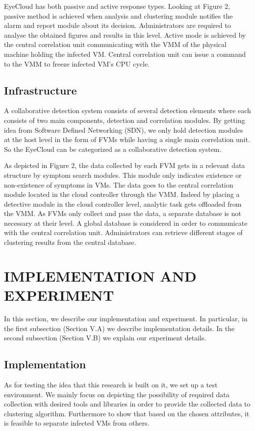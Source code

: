 \documentclass[conference]{IEEEtran}
\begin{document}
EyeCloud has both passive and active response types. Looking at Figure 2, passive method is achieved when analysis and clustering module notifies the alarm and report module about its decision. Administrators are required to analyse the obtained figures and results in this level. Active mode is achieved by the central correlation unit communicating with the VMM of the physical machine holding the infected VM. Central correlation unit can issue a command to the VMM to freeze infected VM's CPU cycle.
\subsection{Infrastructure}
A collaborative detection system consists of several detection elements where each consists of two main components, detection and correlation modules. By getting idea from Software Defined Networking (SDN), we only hold detection modules at the host level in the form of FVMs while having a single main correlation unit. So the EyeCloud can be categorized as a collaborative detection system. 

As depicted in Figure 2, the data collected by each FVM gets in a relevant data structure by symptom search modules. This module only indicates existence or non-existence of symptoms in VMs. The data goes to the central correlation module located in the cloud controller through the VMM. Indeed by placing a detective module in the cloud controller level, analytic task gets offloaded from the VMM. As FVMs only collect and pass the data, a separate database is not necessary at their level. A global database is considered in order to communicate with the central correlation unit. Administrators can retrieve different stages of clustering results from the central database.
 
\section{IMPLEMENTATION AND EXPERIMENT}
In this section, we describe our implementation and experiment. In particular, in the first subsection (Section V.A) we describe implementation details. In the second subsection (Section V.B) we explain our experiment details.
\subsection{Implementation}
As for testing the idea that this research is built on it, we set up a test environment. We mainly focus on depicting the possibility of required data collection with desired tools and libraries in order to provide the collected data to clustering algorithm. Furthermore to show that based on the chosen attributes, it is feasible to separate infected VMs from others. 
\end{document}
